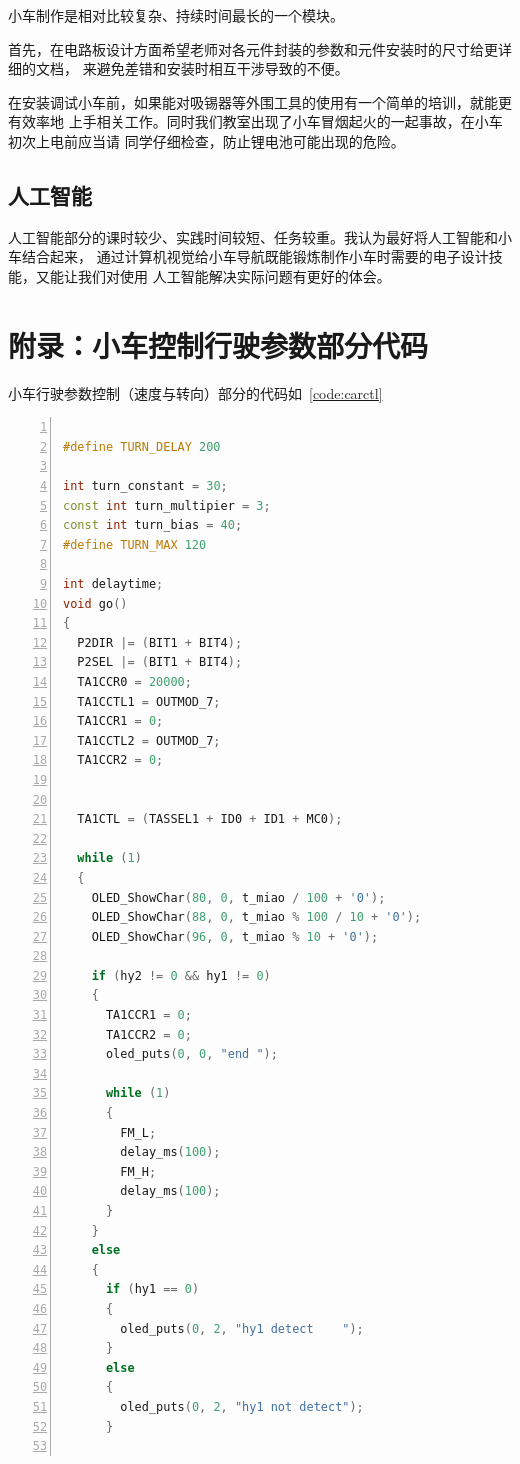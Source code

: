 \documentclass[a4paper,twoside,zihao=5,UTF8]{ctexart}
\begin{document}
\begin{spacing}{1.2}
小车制作是相对比较复杂、持续时间最长的一个模块。

首先，在电路板设计方面希望老师对各元件封装的参数和元件安装时的尺寸给更详细的文档，
来避免差错和安装时相互干涉导致的不便。

在安装调试小车前，如果能对吸锡器等外围工具的使用有一个简单的培训，就能更有效率地
上手相关工作。同时我们教室出现了小车冒烟起火的一起事故，在小车初次上电前应当请
同学仔细检查，防止锂电池可能出现的危险。

\subsection{人工智能}

人工智能部分的课时较少、实践时间较短、任务较重。我认为最好将人工智能和小车结合起来，
通过计算机视觉给小车导航既能锻炼制作小车时需要的电子设计技能，又能让我们对使用
人工智能解决实际问题有更好的体会。

\clearpage

\appendix
\section*{附录：小车控制行驶参数部分代码}

小车行驶参数控制（速度与转向）部分的代码如~\ref{code:carctl}

\begin{lstlisting}[language=c++,numbers=left,style=CppStyle,caption=作业6,label={code:carctl}]

#define TURN_DELAY 200

int turn_constant = 30;
const int turn_multipier = 3;
const int turn_bias = 40;
#define TURN_MAX 120

int delaytime;
void go()
{
  P2DIR |= (BIT1 + BIT4);
  P2SEL |= (BIT1 + BIT4);
  TA1CCR0 = 20000;        
  TA1CCTL1 = OUTMOD_7;
  TA1CCR1 = 0; 
  TA1CCTL2 = OUTMOD_7;
  TA1CCR2 = 0; 

 
  TA1CTL = (TASSEL1 + ID0 + ID1 + MC0);

  while (1)
  {
    OLED_ShowChar(80, 0, t_miao / 100 + '0'); 
    OLED_ShowChar(88, 0, t_miao % 100 / 10 + '0');
    OLED_ShowChar(96, 0, t_miao % 10 + '0');

    if (hy2 != 0 && hy1 != 0) 
    {
      TA1CCR1 = 0; 
      TA1CCR2 = 0;
      oled_puts(0, 0, "end ");

      while (1)
      {
        FM_L;
        delay_ms(100);
        FM_H; 
        delay_ms(100);
      }
    }
    else 
    {
      if (hy1 == 0) 
      {
        oled_puts(0, 2, "hy1 detect    ");
      }
      else
      {
        oled_puts(0, 2, "hy1 not detect");
      }


\end{lstlisting}
\end{spacing}
\end{document}
